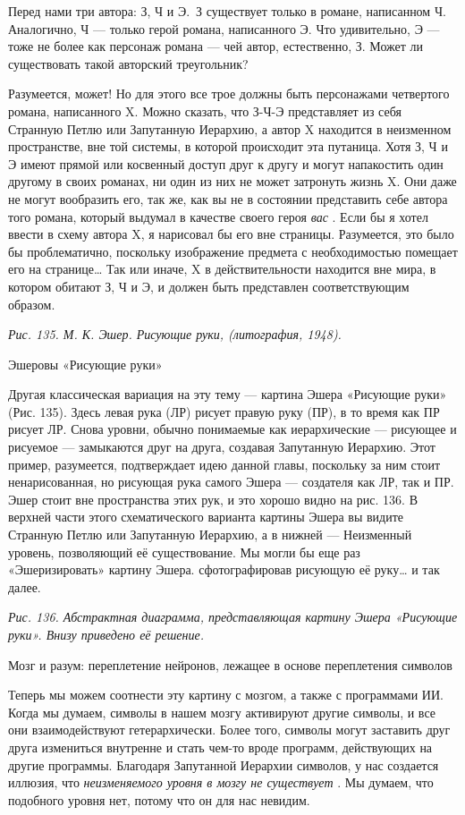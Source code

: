 \documentclass[../main.tex]{subfiles}
\begin{document}
Перед нами три автора: З, Ч и Э.~З существует только в романе, написанном Ч. Аналогично, Ч --- только герой романа, написанного Э. Что удивительно, Э --- тоже не более как персонаж романа --- чей автор, естественно, З. Может ли существовать такой авторский треугольник?

Разумеется, может! Но для этого все трое должны быть персонажами четвертого романа, написанного X. Можно сказать, что З-Ч-Э представляет из себя Странную Петлю или Запутанную Иерархию, а автор X находится в неизменном пространстве, вне той системы, в которой происходит эта путаница. Хотя З, Ч и Э имеют прямой или косвенный доступ друг к другу и могут напакостить один другому в своих романах, ни один из них не может затронуть жизнь X. Они даже не могут вообразить его, так же, как вы не в состоянии представить себе автора того романа, который выдумал в качестве своего героя \emph{вас} . Если бы я хотел ввести в схему автора X, я нарисовал бы его вне страницы. Разумеется, это было бы проблематично, поскольку изображение предмета с необходимостью помещает его на странице\ldots{} Так или иначе, X в действительности находится вне мира, в котором обитают З, Ч и Э, и должен быть представлен соответствующим образом.

\emph{Рис. 135. М. К. Эшер. Рисующие руки, (литография, 1948).}

Эшеровы «Рисующие руки»

Другая классическая вариация на эту тему --- картина Эшера «Рисующие руки» (Рис. 135). Здесь левая рука (ЛР) рисует правую руку (ПР), в то время как ПР рисует ЛР. Снова уровни, обычно понимаемые как иерархические --- рисующее и рисуемое --- замыкаются друг на друга, создавая Запутанную Иерархию. Этот пример, разумеется, подтверждает идею данной главы, поскольку за ним стоит ненарисованная, но рисующая рука самого Эшера --- создателя как ЛР, так и ПР. Эшер стоит вне пространства этих рук, и это хорошо видно на рис. 136. В верхней части этого схематического варианта картины Эшера вы видите Странную Петлю или Запутанную Иерархию, а в нижней --- Неизменный уровень, позволяющий её существование. Мы могли бы еще раз «Эшеризировать» картину Эшера. сфотографировав рисующую её руку\ldots{} и так далее.

\emph{Рис. 136. Абстрактная диаграмма, представляющая картину Эшера «Рисующие руки». Внизу приведено её решение.}

Мозг и разум: переплетение нейронов, лежащее в основе переплетения символов

Теперь мы можем соотнести эту картину с мозгом, а также с программами ИИ. Когда мы думаем, символы в нашем мозгу активируют другие символы, и все они взаимодействуют гетерархически. Более того, символы могут заставить друг друга измениться внутренне и стать чем-то вроде программ, действующих на другие программы. Благодаря Запутанной Иерархии символов, у нас создается иллюзия, что \emph{неизменяемого уровня в мозгу не существует} . Мы думаем, что подобного уровня нет, потому что он для нас невидим.
\end{document}
